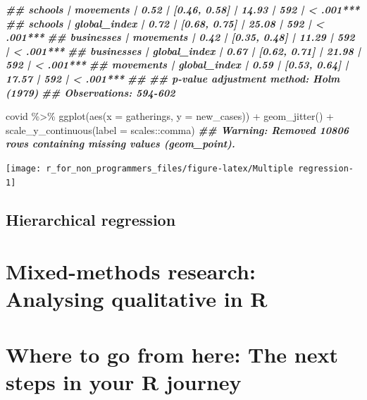 \documentclass[
]{book}
\newenvironment{Shaded}{\begin{snugshade}}{\end{snugshade}}
\newcommand{\AttributeTok}[1]{\textcolor[rgb]{0.77,0.63,0.00}{#1}}
\newcommand{\DocumentationTok}[1]{\textcolor[rgb]{0.56,0.35,0.01}{\textbf{\textit{#1}}}}
\newcommand{\FunctionTok}[1]{\textcolor[rgb]{0.00,0.00,0.00}{#1}}
\newcommand{\NormalTok}[1]{#1}
\newcommand{\SpecialCharTok}[1]{\textcolor[rgb]{0.00,0.00,0.00}{#1}}
\begin{document}
\begin{Shaded}
\begin{Highlighting}[]
\DocumentationTok{\#\# schools           |         movements | 0.52 | [0.46, 0.58] | 14.93 | 592 | \textless{} .001***}
\DocumentationTok{\#\# schools           |      global\_index | 0.72 | [0.68, 0.75] | 25.08 | 592 | \textless{} .001***}
\DocumentationTok{\#\# businesses        |         movements | 0.42 | [0.35, 0.48] | 11.29 | 592 | \textless{} .001***}
\DocumentationTok{\#\# businesses        |      global\_index | 0.67 | [0.62, 0.71] | 21.98 | 592 | \textless{} .001***}
\DocumentationTok{\#\# movements         |      global\_index | 0.59 | [0.53, 0.64] | 17.57 | 592 | \textless{} .001***}
\DocumentationTok{\#\# }
\DocumentationTok{\#\# p{-}value adjustment method: Holm (1979)}
\DocumentationTok{\#\# Observations: 594{-}602}


\NormalTok{covid }\SpecialCharTok{\%\textgreater{}\%}
  \FunctionTok{ggplot}\NormalTok{(}\FunctionTok{aes}\NormalTok{(}\AttributeTok{x =}\NormalTok{ gatherings,}
             \AttributeTok{y =}\NormalTok{ new\_cases)) }\SpecialCharTok{+}
  \FunctionTok{geom\_jitter}\NormalTok{() }\SpecialCharTok{+}
  \FunctionTok{scale\_y\_continuous}\NormalTok{(}\AttributeTok{label =}\NormalTok{ scales}\SpecialCharTok{::}\NormalTok{comma)}
\DocumentationTok{\#\# Warning: Removed 10806 rows containing missing values (geom\_point).}
\end{Highlighting}
\end{Shaded}

\begin{center}\texttt{[image: r\_for\_non\_programmers\_files/figure-latex/Multiple regression-1]} \end{center}

\hypertarget{hierarchical-regression}{%
\section{Hierarchical regression}\label{hierarchical-regression}}

\hypertarget{mixed-methods-research-analysing-qualitative-in-r}{%
\chapter{Mixed-methods research: Analysing qualitative in R}\label{mixed-methods-research-analysing-qualitative-in-r}}

\hypertarget{next-steps}{%
\chapter{Where to go from here: The next steps in your R journey}\label{next-steps}}
\end{document}

